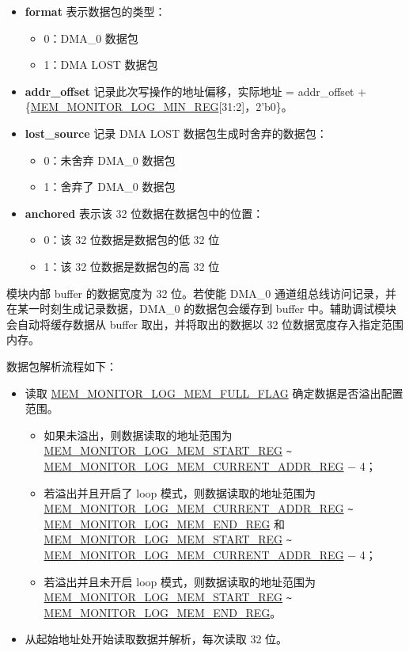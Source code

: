 \documentclass[main\_\_CN.tex]{subfiles}
\begin{document}
\begin{itemize}
    \item \textbf{format} 表示数据包的类型：
    \begin{itemize}
        \item 0：DMA\_0 数据包
        \item 1：DMA LOST 数据包
    \end{itemize}
    \item \textbf{addr\_offset} 记录此次写操作的地址偏移，实际地址 = addr\_offset + \{\hyperref[regdesc:MEMMONITORLOGMINREG]{MEM\_MONITOR\_LOG\_MIN\_REG}[31:2]，2'b0\}。
    \item \textbf{lost\_source} 记录 DMA LOST 数据包生成时舍弃的数据包：
    \begin{itemize}
        \item 0：未舍弃 DMA\_0 数据包
        \item 1：舍弃了 DMA\_0 数据包
    \end{itemize}
    \item \textbf{anchored} 表示该 32 位数据在数据包中的位置：
    \begin{itemize}
        \item 0：该 32 位数据是数据包的低 32 位
        \item 1：该 32 位数据是数据包的高 32 位
    \end{itemize}
\end{itemize}

模块内部 buffer 的数据宽度为 32 位。若使能 DMA\_0 通道组总线访问记录，并在某一时刻生成记录数据，DMA\_0 的数据包会缓存到 buffer 中。辅助调试模块会自动将缓存数据从 buffer 取出，并将取出的数据以 32 位数据宽度存入指定范围内存。

数据包解析流程如下：

\begin{itemize}
    \item 读取 \hyperref[fielddesc:MEMMONITORLOGMEMFULLFLAG]{MEM\_MONITOR\_LOG\_MEM\_FULL\_FLAG} 确定数据是否溢出配置范围。
    \begin{itemize}
        \item 如果未溢出，则数据读取的地址范围为 \hyperref[regdesc:MEMMONITORLOGMEMSTARTREG]{MEM\_MONITOR\_LOG\_MEM\_START\_REG}  \verb+~+ \hyperref[regdesc:MEMMONITORLOGMEMCURRENTADDRREG]{MEM\_MONITOR\_LOG\_MEM\_CURRENT\_ADDR\_REG} $-$ 4；
        \item 若溢出并且开启了 loop 模式，则数据读取的地址范围为 \hyperref[regdesc:MEMMONITORLOGMEMCURRENTADDRREG]{MEM\_MONITOR\_LOG\_MEM\_CURRENT\_ADDR\_REG} \verb+~+ \hyperref[regdesc:MEMMONITORLOGMEMENDREG]{MEM\_MONITOR\_LOG\_MEM\_END\_REG} 和 \hyperref[regdesc:MEMMONITORLOGMEMSTARTREG]{MEM\_MONITOR\_LOG\_MEM\_START\_REG} \verb+~+ \hyperref[regdesc:MEMMONITORLOGMEMCURRENTADDRREG]{MEM\_MONITOR\_LOG\_MEM\_CURRENT\_ADDR\_REG} $-$ 4；
        \item 若溢出并且未开启 loop 模式，则数据读取的地址范围为 \hyperref[regdesc:MEMMONITORLOGMEMSTARTREG]{MEM\_MONITOR\_LOG\_MEM\_START\_REG} \verb+~+ \hyperref[regdesc:MEMMONITORLOGMEMENDREG]{MEM\_MONITOR\_LOG\_MEM\_END\_REG}。
    \end{itemize}
    \item 从起始地址处开始读取数据并解析，每次读取 32 位。
\end{itemize}
\end{document}
